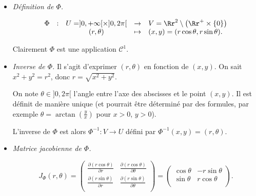 \documentclass[11pt, class=report,crop=false]{standalone}
\begin{document}
\begin{itemize}
    \item \emph{Définition de $\Phi$.}

$$\begin{array}{ccccl}\Phi &:&U=]0,+\infty [\times ]0,2\pi [
&\to&V=\Rr^2\setminus \left(\Rr^+\times\{0\}\right)\\
&&(r,\theta)&\mapsto &(x,y)=(r\cos\theta, r \sin\theta).\end{array}$$
  
   Clairement $\Phi$ est une application $\mathcal{C}^1$.
   
\begin{center} 
\begin{minipage}{0.3\textwidth}      
\end{minipage}\qquad\qquad
\begin{minipage}{0.55\textwidth}  
\end{minipage}  
\end{center}
   
  \item \emph{Inverse de $\Phi$.}    
  Il s'agit d'exprimer $(r,\theta)$ en fonction de $(x,y)$.
  On sait $x^2+y^2 = r^2$, donc $r = \sqrt{x^2+y^2}$.
  
  On note $\theta \in ]0,2\pi[$ l'angle  entre l'axe des abscisses et le point $(x,y)$. Il est définit de manière unique (et pourrait être déterminé par des formules, par exemple $\theta = \arctan(\frac y x)$ pour $x>0$, $y>0$).
  
  L'inverse de $\Phi$ est alors $\Phi^{-1} : V \to U$ défini par 
  $\Phi^{-1}(x,y) = (r,\theta)$.
  
  \item \emph{Matrice jacobienne de $\Phi$.}

$$J_\Phi(r,\theta)
= 
\begin{pmatrix}\frac{\partial (r\cos\theta)}{\partial r} & \frac{\partial (r\cos\theta)}{\partial \theta} \\
\frac{\partial (r\sin\theta)}{\partial r} & \frac{\partial (r\sin\theta)}{\partial \theta} \\
\end{pmatrix}
= 
\begin{pmatrix}
\cos \theta &-r\sin \theta \\
\sin \theta &r\cos \theta \\
\end{pmatrix}.$$
  

\end{itemize}
\end{document}
